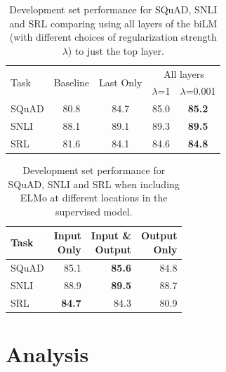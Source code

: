 \documentclass[11pt,a4paper]{article}
\newcommand{\ELMO}{ELMo}
\begin{document}
\begin{table}
\centering
\begin{tabular}[t]{l|c|c|cc}
\multirow{2}{*}{Task} & \multirow{2}{*}{Baseline} & \multirow{2}{*}{Last Only} & \multicolumn{2}{c}{All layers} \\ 
 & & & $\lambda$=1 & $\lambda$=0.001 \\ \hline \hline
SQuAD     &     80.8     & 84.7   & 85.0        &      \textbf{85.2} \\
SNLI   &    88.1    & 89.1   & 89.3        &      \textbf{89.5}  \\
SRL    &    81.6     & 84.1   & 84.6        &      \textbf{84.8} \\
\end{tabular}
\caption{Development set performance for SQuAD, SNLI and SRL comparing using all layers of the biLM (with different choices of regularization strength $\lambda$) to just the top layer.}
\label{table:alternate_weights}
\end{table}

\begin{table}
\centering
\begin{tabular}[t]{p{8ex}|r|r|r}
Task & \parbox{8ex}{Input \\ Only} & \parbox{7ex}{Input \& \\ Output} & \parbox{6ex}{Output \\ Only} \\ \hline \hline
SQuAD        & 85.1        & \textbf{85.6}   & 84.8 \\
SNLI         & 88.9        &  \textbf{89.5}  &            88.7  \\
SRL          & \textbf{84.7}        &  84.3  &            80.9  \\
\end{tabular}
\caption{Development set performance for SQuAD, SNLI and SRL when including \ELMO{} at different locations in the supervised model.}
\label{table:where_to_include_elmo}
\end{table}




\section{Analysis}
\end{document}
